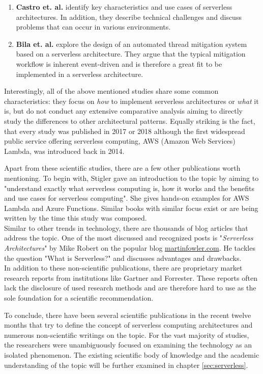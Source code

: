 \begin{enumerate}
    \item 
        \textbf{Castro et. al.} identify key characteristics and use cases of serverless architectures. In addition, they describe technical challenges and discuss problems that can occur in various environments.
    \item
        \textbf{Bila et. al.} explore the design of an automated thread mitigation system based on a serverless architecture. They argue that the typical mitigation workflow is inherent event-driven and is therefore a great fit to be implemented in a serverless architecture.  \autocite{Bila2017LeveragingContainers}
\end{enumerate}

Interestingly, all of the above mentioned studies share some common characteristics: they focus on \textit{how} to implement serverless architectures or \textit{what} it is, but do not conduct any extensive comparative analysis aiming to directly study the differences to other architectural patterns. Equally striking is the fact, that every study was published in 2017 or 2018 although the first widespread public service offering serverless computing, AWS (Amazon Web Services) Lambda, was introduced back in 2014.\autocite{Lindblom2014AWSBlog}

Apart from these scientific studies, there are a few other publications worth mentioning. To begin with, Stigler gave an introduction to the topic by aiming to "understand exactly what serverless computing is, how it works and the benefits and use cases for serverless computing". She gives hands-on examples for AWS Lambda and Azure Functions. Similar books with similar focus exist or are being written by the time this study was composed.\autocite{Stigler2018UnderstandingComputing}\\
Similar to other trends in technology, there are thousands of blog articles that address the topic. One of the most discussed and recognized posts is "\textit{Serverless Architectures}" by Mike Robert on the popular blog \url{martinfowler.com}\autocite{Roberts2016ServerlessArchitectures}. He tackles the question "What is Serverless?" and discusses advantages and drawbacks. \\
In addition to these non-scientific publications, there are proprietary market research reports from institutions like Gartner and Forrester. These reports often lack the disclosure of used research methods and are therefore hard to use as the sole foundation for a scientific recommendation. 

To conclude, there have been several scientific publications in the recent twelve months that try to define the concept of serverless computing architectures and numerous non-scientific writings on the topic. For the vast majority of studies, the researchers were unambiguously focused on examining the technology as an isolated phenomenon. The existing scientific body of knowledge and the academic understanding of the topic will be further examined in chapter \ref{sec:serverless}.

